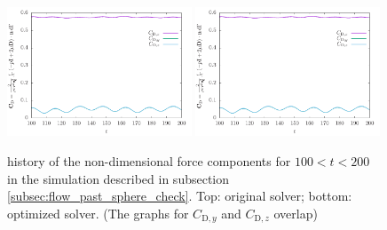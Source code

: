 \documentclass[11pt, a4paper]{article}
\theoremstyle{remark}
\begin{document}
\begin{figure}
  \centering
  \includegraphics[width=0.49\textwidth]{./results/flow_past_sphere_smoke/reference/force_history.pdf}
  \includegraphics[width=0.49\textwidth]{./results/flow_past_sphere_smoke/optimized_run/force_history.pdf}
 \caption{\label{fig:forces_flow_past_sphere_check_unchanged} history of the non-dimensional force components for $100 < t < 200$ in the simulation described in subsection \ref{subsec:flow_past_sphere_check}. Top: original solver; bottom: optimized solver. (The graphs for $C_{\mathrm{D}, y}$ and $C_{\mathrm{D}, z}$ overlap)} 
\end{figure}
\end{document}
